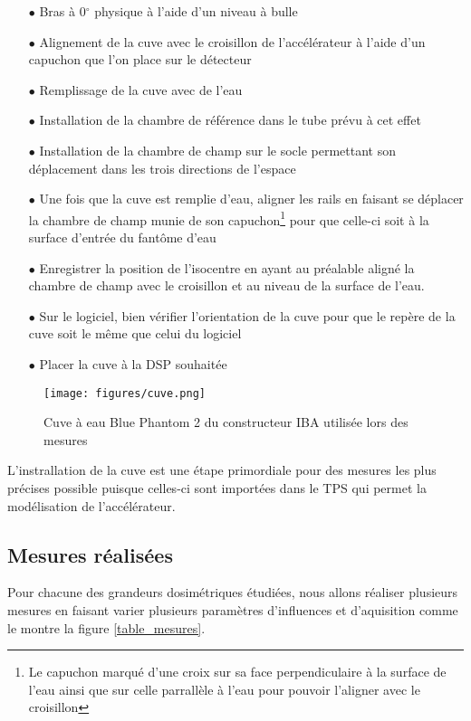 \documentclass{book}
\begin{document}
\begin{itemize}
  \item[$\bullet$] Bras à 0$^{\circ}$ physique à l'aide d'un niveau à bulle 
  \item[$\bullet$] Alignement de la cuve avec le croisillon de l'accélérateur à l'aide d'un capuchon que l'on place sur le détecteur
  \item[$\bullet$] Remplissage de la cuve avec de l'eau
  \item[$\bullet$] Installation de la chambre de référence dans le tube prévu à cet effet
  \item[$\bullet$] Installation de la chambre de champ sur le socle permettant son déplacement dans les trois directions de l'espace
  \item[$\bullet$] Une fois que la cuve est remplie d'eau, aligner les rails en faisant se déplacer la chambre de champ munie de son capuchon\footnote{Le capuchon marqué d'une croix sur sa face perpendiculaire à la surface de l'eau ainsi que sur celle parrallèle à l'eau pour pouvoir l'aligner avec le croisillon} pour que celle-ci soit à la surface d'entrée du fantôme d'eau
  \item[$\bullet$] Enregistrer la position de l'isocentre en ayant au préalable aligné la chambre de champ avec le croisillon et au niveau de la surface de l'eau. 
  \item[$\bullet$] Sur le logiciel, bien vérifier l'orientation de la cuve pour que le repère de la cuve soit le même que celui du logiciel
  \item[$\bullet$] Placer la cuve à la DSP souhaitée
\end{itemize}

\begin{figure}[h]
  \centering
  \texttt{[image: figures/cuve.png]}
  \caption{Cuve à eau Blue Phantom 2 du constructeur IBA utilisée lors des mesures}
  \label{fig_cuve}
\end{figure}

L'instrallation de la cuve est une étape primordiale pour des mesures les plus précises possible puisque celles-ci sont importées dans le TPS qui permet la modélisation de l'accélérateur.

\newpage
\subsection{Mesures réalisées}

Pour chacune des grandeurs dosimétriques étudiées, nous allons réaliser plusieurs mesures en faisant varier plusieurs paramètres d'influences et d'aquisition comme le montre la figure \ref*{table_mesures}.
\end{document}

